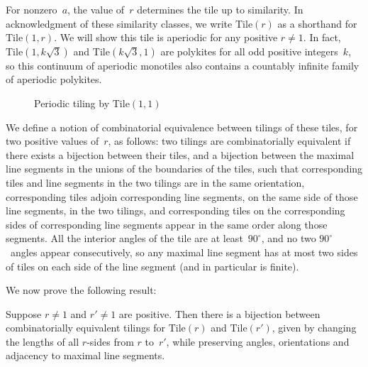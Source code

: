 For nonzero~$a$, the value 
of~$r$ determines the tile up to similarity.  In acknowledgment of 
these similarity classes, we write $\mathrm{Tile}(r)$ as a
shorthand for $\mathrm{Tile}(1,r)$.  We will show this tile is
aperiodic for any positive $r \ne 1$.
In fact, $\mathrm{Tile}(1, k\sqrt{3})$ and $\mathrm{Tile}(k\sqrt{3},
1)$ are polykites for all odd positive integers~$k$, so this continuum
of aperiodic monotiles also contains a countably infinite family of
aperiodic polykites.

\begin{figure}[htp!]
\begin{center}
\end{center}
\caption{Periodic tiling by $\mathrm{Tile}(1, 1)$}
\label{fig:tile1periodic}
\end{figure}

We define a notion of combinatorial equivalence between tilings of
these tiles, for two positive values of~$r$, as follows: two tilings
are combinatorially equivalent if there exists a bijection between
their tiles, and a bijection between the maximal line segments in the
unions of the boundaries of the tiles, such that corresponding tiles
and line segments in the two tilings are in the same orientation,
corresponding tiles adjoin corresponding line segments, on the same
side of those line segments, in the two tilings, and corresponding
tiles on the corresponding sides of corresponding line segments appear
in the same order along those segments.  All the interior angles of
the tile are at least~$90^\circ$, and no two $90^\circ$~angles appear
consecutively, so any maximal line segment has at most two sides of
tiles on each side of the line segment (and in particular is finite).

We now prove the following result:

\begin{theorem}
\label{thm:tilercomb}
Suppose $r \ne 1$ and $r'\ne 1$ are positive.  Then there is a
bijection between combinatorially equivalent tilings for $\mathrm{Tile}(r)$ and
$\mathrm{Tile}(r')$, given by changing the lengths of all $r$-sides from $r$
to~$r'$, while preserving angles, orientations and adjacency to
maximal line segments.
\end{theorem}

